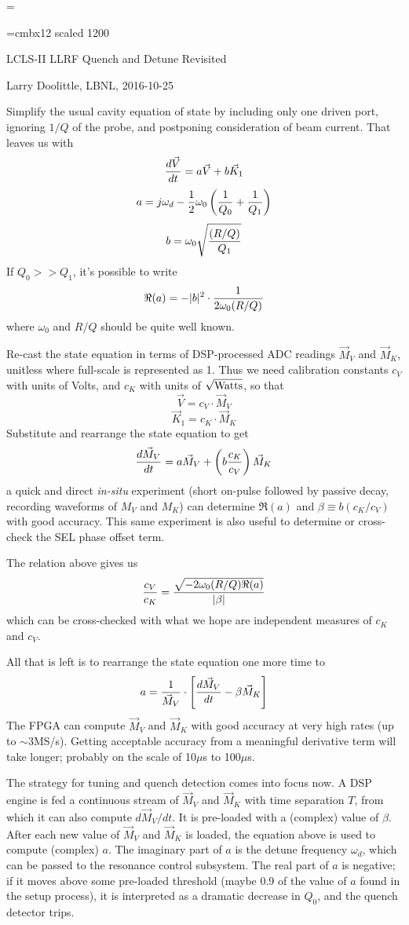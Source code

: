 
\magnification=

\parindent=0pt
\parskip=6pt
\baselineskip=14.0pt
\font\big=cmbx12 scaled 1200

\centerline{\big LCLS-II LLRF Quench and Detune Revisited}
\smallskip
\centerline{Larry Doolittle, LBNL, 2016-10-25}
\bigskip
Simplify the usual cavity equation of state by including only
one driven port, ignoring $1/Q$ of the probe, and postponing consideration
of beam current.
That leaves us with
$$ {d\vec V\over dt} = a \vec V + b \vec K_1 $$
$$ a = j\omega_d - {1\over 2}\omega_0\left({1\over Q_0}+{1\over Q_1}\right) $$
$$ b = \omega_0\sqrt{(R/Q)\over Q_1} $$
If $Q_0 >> Q_1$, it's possible to write
$$ \Re(a) = -|b|^2 \cdot {1\over 2\omega_0 (R/Q)} $$
where $\omega_0$ and $R/Q$ should be quite well known.

Re-cast the state equation in terms of DSP-processed ADC readings
$\vec M_V$ and $\vec M_K$, unitless where full-scale is represented as 1.
Thus we need calibration constants $c_V$ with units of Volts, and
$c_K$ with units of $\sqrt{\rm Watts}$, so that
$$ \vec V = c_V \cdot \vec M_V $$
$$ \vec K_1 = c_K \cdot \vec M_K $$
Substitute and rearrange the state equation to get
$$ {d\vec M_V\over dt} = a \vec M_V + \left(b{c_K\over c_V}\right) \vec M_K $$
a quick and direct {\it in-situ} experiment (short on-pulse followed by
passive decay, recording waveforms of $M_V$ and $M_K$) can determine
$\Re(a)$ and $\beta \equiv b(c_K/c_V)$ with good accuracy.
This same experiment is
also useful to determine or cross-check the SEL phase offset term.

The relation above gives us
$$ {c_V\over c_K} = {\sqrt{-2\omega_0 (R/Q) \Re(a)}\over |\beta|} $$
which can be cross-checked with what we hope are independent measures
of $c_K$ and $c_V$.

All that is left is to rearrange the state equation one more time to
$$a = {1\over \vec M_V}\cdot \left[{d\vec M_V\over dt} - \beta \vec M_K\right] $$
The FPGA can compute $\vec M_V$ and $\vec M_K$ with good accuracy at
very high rates (up to $\sim$3\thinspace MS/s).  Getting acceptable
accuracy from a meaningful derivative term will take longer;
probably on the scale of 10\thinspace $\mu$s to 100\thinspace $\mu$s.

The strategy for tuning and quench detection comes into focus now.
A DSP engine is fed a continuous stream of $\vec M_V$ and $\vec M_K$
with time separation $T$, from which it can also compute $d\vec M_V/dt$.
It is pre-loaded with a (complex) value of $\beta $.
After each new value of $\vec M_V$ and $\vec M_K$ is loaded, the
equation above is used to compute (complex) $a$.  The imaginary part
of $a$ is the detune frequency $\omega_d$, which can be passed to
the resonance control subsystem.  The real part of $a$ is negative;
if it moves above some pre-loaded threshold (maybe 0.9 of the value of
$a$ found in the setup process), it is interpreted as a dramatic decrease
in $Q_0$, and the quench detector trips.

